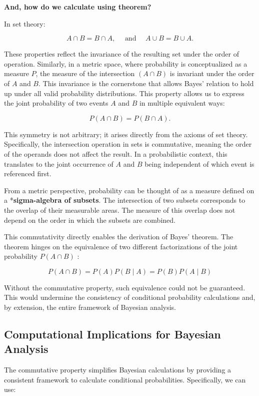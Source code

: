 \documentclass[
  12 pt,
  a4paper,
]{book}
\numberwithin{equation}{section}
\theoremstyle{plain}      %
\theoremstyle{definition} %
\theoremstyle{remark}     %
\theoremstyle{note}         %
\begin{document}
\textbf{And, how do we calculate using theorem?}

In set theory:

\[
A \cap B=B \cap A, \quad \text { and } \quad A \cup B=B \cup A .
\]

These properties reflect the invariance of the resulting set under the
order of operation. Similarly, in a metric space, where probability is
conceptualized as a measure \(P\), the measure of the intersection
\((A \cap B)\) is invariant under the order of \(A\) and \(B\). This
invariance is the cornerstone that allows Bayes' relation to hold up
under all valid probability distributions. This property allows us to
express the joint probability of two events \(A\) and \(B\) in multiple
equivalent ways:

\[
P(A \cap B)=P(B \cap A) .
\]

This symmetry is not arbitrary; it arises directly from the axioms of
set theory. Specifically, the intersection operation in sets is
commutative, meaning the order of the operands does not affect the
result. In a probabilistic context, this translates to the joint
occurrence of \(A\) and \(B\) being independent of which event is
referenced first.

From a metric perspective, probability can be thought of as a measure
defined on a *\textbf{sigma-algebra of subsets}. The intersection of two
subsets corresponds to the overlap of their measurable areas. The
measure of this overlap does not depend on the order in which the
subsets are combined.

This commutativity directly enables the derivation of Bayes' theorem.
The theorem hinges on the equivalence of two different factorizations of
the joint probability \(P(A \cap B)\) :

\[
P(A \cap B)=P(A) P(B \mid A)=P(B) P(A \mid B)
\]

Without the commutative property, such equivalence could not be
guaranteed. This would undermine the consistency of conditional
probability calculations and, by extension, the entire framework of
Bayesian analysis.

\hypertarget{computational-implications-for-bayesian-analysis}{%
\subsection{Computational Implications for Bayesian
Analysis}\label{computational-implications-for-bayesian-analysis}}

The commutative property simplifies Bayesian calculations by providing a
consistent framework to calculate conditional probabilities.
Specifically, we can use:
\end{document}
